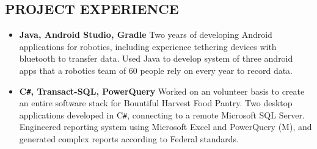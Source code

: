 \documentclass[overlapped]{res}
\begin{document}
\begin{resume}
    \section{PROJECT EXPERIENCE}
    
    \begin{itemize}[label={}]  \itemsep -2pt %
        \item \textbf{Java, Android Studio, Gradle}
              Two years of developing Android applications for robotics, including experience tethering devices with bluetooth to transfer data.
              Used Java to develop system of three android apps that a robotics team of 60 people rely on every year to record data.
        \item \textbf{C\texttt{\#}, Transact-SQL, PowerQuery}
        Worked on an volunteer basis to create an entire software stack for Bountiful Harvest Food Pantry. Two desktop applications developed in C\texttt{\#},
         connecting to a remote Microsoft SQL Server. Engineered reporting system using Microsoft Excel and PowerQuery (M), and generated complex reports according
          to Federal standards.
    \end{itemize}
    

\end{resume}
\end{document}
